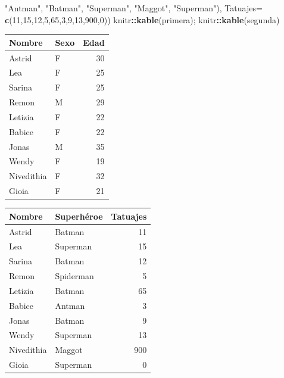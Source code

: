 \documentclass[
]{book}
\newenvironment{Shaded}{\begin{snugshade}}{\end{snugshade}}
\newcommand{\AttributeTok}[1]{\textcolor[rgb]{0.13,0.29,0.53}{#1}}
\newcommand{\DecValTok}[1]{\textcolor[rgb]{0.00,0.00,0.81}{#1}}
\newcommand{\FunctionTok}[1]{\textcolor[rgb]{0.13,0.29,0.53}{\textbf{#1}}}
\newcommand{\NormalTok}[1]{#1}
\newcommand{\SpecialCharTok}[1]{\textcolor[rgb]{0.81,0.36,0.00}{\textbf{#1}}}
\newcommand{\StringTok}[1]{\textcolor[rgb]{0.31,0.60,0.02}{#1}}
\begin{document}
\begin{Shaded}
\begin{Highlighting}[]
                                   \StringTok{"Antman"}\NormalTok{, }\StringTok{"Batman"}\NormalTok{, }\StringTok{"Superman"}\NormalTok{, }\StringTok{"Maggot"}\NormalTok{, }\StringTok{"Superman"}\NormalTok{),}
                     \AttributeTok{Tatuajes=} \FunctionTok{c}\NormalTok{(}\DecValTok{11}\NormalTok{,}\DecValTok{15}\NormalTok{,}\DecValTok{12}\NormalTok{,}\DecValTok{5}\NormalTok{,}\DecValTok{65}\NormalTok{,}\DecValTok{3}\NormalTok{,}\DecValTok{9}\NormalTok{,}\DecValTok{13}\NormalTok{,}\DecValTok{900}\NormalTok{,}\DecValTok{0}\NormalTok{))}
\NormalTok{knitr}\SpecialCharTok{::}\FunctionTok{kable}\NormalTok{(primera); knitr}\SpecialCharTok{::}\FunctionTok{kable}\NormalTok{(segunda)}
\end{Highlighting}
\end{Shaded}

\begin{tabular}{l|l|r}
\hline
Nombre & Sexo & Edad\\
\hline
Astrid & F & 30\\
\hline
Lea & F & 25\\
\hline
Sarina & F & 25\\
\hline
Remon & M & 29\\
\hline
Letizia & F & 22\\
\hline
Babice & F & 22\\
\hline
Jonas & M & 35\\
\hline
Wendy & F & 19\\
\hline
Nivedithia & F & 32\\
\hline
Gioia & F & 21\\
\hline
\end{tabular}

\begin{tabular}{l|l|r}
\hline
Nombre & Superhéroe & Tatuajes\\
\hline
Astrid & Batman & 11\\
\hline
Lea & Superman & 15\\
\hline
Sarina & Batman & 12\\
\hline
Remon & Spiderman & 5\\
\hline
Letizia & Batman & 65\\
\hline
Babice & Antman & 3\\
\hline
Jonas & Batman & 9\\
\hline
Wendy & Superman & 13\\
\hline
Nivedithia & Maggot & 900\\
\hline
Gioia & Superman & 0\\
\hline
\end{tabular}
\end{document}
